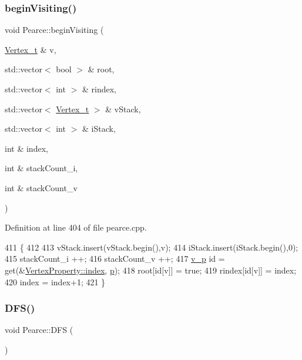 \subsubsection{\texorpdfstring{begin\+Visiting()}{beginVisiting()}}
{\footnotesize\ttfamily void Pearce\+::begin\+Visiting (\begin{DoxyParamCaption}\item[{\hyperlink{class_graph_component_ae67114a6ce5a001dc35e1996e1b45aa0}{Vertex\+\_\+t} \&}]{v,  }\item[{std\+::vector$<$ bool $>$ \&}]{root,  }\item[{std\+::vector$<$ int $>$ \&}]{rindex,  }\item[{std\+::vector$<$ \hyperlink{class_graph_component_ae67114a6ce5a001dc35e1996e1b45aa0}{Vertex\+\_\+t} $>$ \&}]{v\+Stack,  }\item[{std\+::vector$<$ int $>$ \&}]{i\+Stack,  }\item[{int \&}]{index,  }\item[{int \&}]{stack\+Count\+\_\+i,  }\item[{int \&}]{stack\+Count\+\_\+v }\end{DoxyParamCaption})}



Definition at line 404 of file pearce.\+cpp.


\begin{DoxyCode}
411                                              \{
412     
413     vStack.insert(vStack.begin(),v);
414     iStack.insert(iStack.begin(),0);
415     stackCount\_i ++;
416     stackCount\_v ++;
417     \hyperlink{utilities_8h_a3f4959b3d837fa6351a9414c79280286}{v\_p} \textcolor{keywordtype}{id} = \textcolor{keyword}{get}(&\hyperlink{struct_utility_structs_1_1_vertex_property_a636cb729438e999aa3d9a17ac39d8641}{VertexProperty::index}, \hyperlink{class_pearce_a2320928312fd97f6bcb1f16684f79a03}{p});
418     root[\textcolor{keywordtype}{id}[v]] = \textcolor{keyword}{true};
419     rindex[\textcolor{keywordtype}{id}[v]] = index;
420     index = index+1;
421 \}
\end{DoxyCode}
\mbox{\label{class_pearce_ad50f62a493ed2b5eb7fcb3c0f8e2e079}} 
\subsubsection{\texorpdfstring{D\+F\+S()}{DFS()}}
{\footnotesize\ttfamily void Pearce\+::\+D\+FS (\begin{DoxyParamCaption}{ }\end{DoxyParamCaption})}



